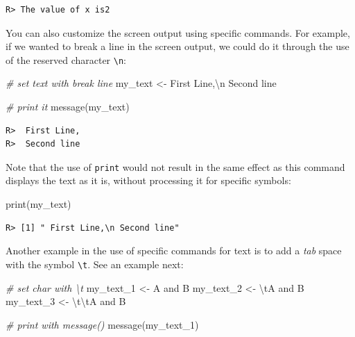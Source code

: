 \documentclass[
  12pt,
]{book}
\newenvironment{Shaded}{\begin{snugshade}}{\end{snugshade}}
\newcommand{\CommentTok}[1]{\textcolor[rgb]{0.37,0.37,0.37}{\textit{#1}}}
\newcommand{\FunctionTok}[1]{\textcolor[rgb]{0,0,0}{#1}}
\newcommand{\NormalTok}[1]{#1}
\newcommand{\OtherTok}[1]{\textcolor[rgb]{0.37,0.37,0.37}{#1}}
\newcommand{\SpecialCharTok}[1]{\textcolor[rgb]{0,0,0}{#1}}
\newcommand{\StringTok}[1]{\textcolor[rgb]{0.5,0.5,0.5}{#1}}
\begin{document}
\begin{verbatim}
R> The value of x is2
\end{verbatim}

You can also customize the screen output using specific commands. For example, if we wanted to break a line in the screen output, we could do it through the use of the reserved character \texttt{\textbackslash{}n}:

\begin{Shaded}
\begin{Highlighting}[]
\CommentTok{\# set text with break line}
\NormalTok{my\_text }\OtherTok{\textless{}{-}} \StringTok{\textquotesingle{} First Line,}\SpecialCharTok{\textbackslash{}n}\StringTok{ Second line\textquotesingle{}}

\CommentTok{\# print it}
\FunctionTok{message}\NormalTok{(my\_text)}
\end{Highlighting}
\end{Shaded}

\begin{verbatim}
R>  First Line,
R>  Second line
\end{verbatim}

Note that the use of \texttt{print} would not result in the same effect as this command displays the text as it is, without processing it for specific symbols:

\begin{Shaded}
\begin{Highlighting}[]
\FunctionTok{print}\NormalTok{(my\_text)}
\end{Highlighting}
\end{Shaded}

\begin{verbatim}
R> [1] " First Line,\n Second line"
\end{verbatim}

Another example in the use of specific commands for text is to add a \emph{tab} space with the symbol \texttt{\textbackslash{}t}. See an example next:

\begin{Shaded}
\begin{Highlighting}[]
\CommentTok{\# set char with \textbackslash{}t}
\NormalTok{my\_text\_1 }\OtherTok{\textless{}{-}} \StringTok{\textquotesingle{}A and B\textquotesingle{}}
\NormalTok{my\_text\_2 }\OtherTok{\textless{}{-}} \StringTok{\textquotesingle{}}\SpecialCharTok{\textbackslash{}t}\StringTok{A and B\textquotesingle{}}
\NormalTok{my\_text\_3 }\OtherTok{\textless{}{-}} \StringTok{\textquotesingle{}}\SpecialCharTok{\textbackslash{}t\textbackslash{}t}\StringTok{A and B\textquotesingle{}}

\CommentTok{\# print with message()}
\FunctionTok{message}\NormalTok{(my\_text\_1)}
\end{Highlighting}
\end{Shaded}
\end{document}
